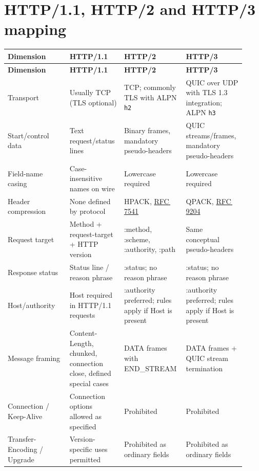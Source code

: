 \documentclass[10pt,letterpaper,oneside]{article}
\newcommand{\field}[1]{{\ttfamily\small\color{Deep}#1}}
\newcommand{\rf}[1]{\href{https://www.rfc-editor.org/rfc/rfc#1.html}{RFC\,#1}}
\begin{document}
\section{HTTP/1.1, HTTP/2 and HTTP/3 mapping}
\small
\begin{longtable}{>{\RaggedRight\arraybackslash}p{0.250\linewidth}>{\RaggedRight\arraybackslash}p{0.223\linewidth}>{\RaggedRight\arraybackslash}p{0.223\linewidth}>{\RaggedRight\arraybackslash}p{0.223\linewidth}}
\toprule\rowcolor{Navy}\color{white}\sffamily\bfseries Dimension & \color{white}\sffamily\bfseries HTTP/1.1 & \color{white}\sffamily\bfseries HTTP/2 & \color{white}\sffamily\bfseries HTTP/3\\\midrule\endfirsthead
\toprule\rowcolor{Navy}\color{white}\sffamily\bfseries Dimension & \color{white}\sffamily\bfseries HTTP/1.1 & \color{white}\sffamily\bfseries HTTP/2 & \color{white}\sffamily\bfseries HTTP/3\\\midrule\endhead
Transport & Usually TCP (TLS optional) & TCP; commonly TLS with ALPN \texttt{h2} & QUIC over UDP with TLS 1.3 integration; ALPN \texttt{h3}\\\midrule
Start/control data & Text request/status lines & Binary frames, mandatory pseudo-headers & QUIC streams/frames, mandatory pseudo-headers\\\midrule
Field-name casing & Case-insensitive names on wire & Lowercase required & Lowercase required\\\midrule
Header compression & None defined by protocol & HPACK, \rf{7541} & QPACK, \rf{9204}\\\midrule
Request target & Method + request-target + HTTP version & \field{:method}, \field{:scheme}, \field{:authority}, \field{:path} & Same conceptual pseudo-headers\\\midrule
Response status & Status line / reason phrase & \field{:status}; no reason phrase & \field{:status}; no reason phrase\\\midrule
Host/authority & \field{Host} required in HTTP/1.1 requests & \field{:authority} preferred; rules apply if Host is present & \field{:authority} preferred; rules apply if Host is present\\\midrule
Message framing & Content-Length, chunked, connection close, defined special cases & DATA frames with END\_STREAM & DATA frames + QUIC stream termination\\\midrule
Connection / Keep-Alive & Connection options allowed as specified & Prohibited & Prohibited\\\midrule
Transfer-Encoding / Upgrade & Version-specific uses permitted & Prohibited as ordinary fields & Prohibited as ordinary fields\\\midrule

\end{longtable}
\end{document}
